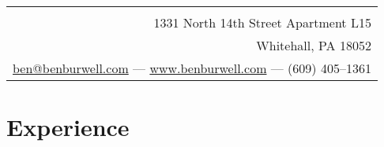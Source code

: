 \documentclass[11pt]{article}
\begin{document}
\thispagestyle{empty}

\noindent\begin{tabularx}{\textwidth}{|N|}
   \\
  1331 North 14th Street Apartment L15 \\
  Whitehall, PA 18052 \\
  \href{mailto:ben@benburwell.com}{ben@benburwell.com} --- \href{https://www.benburwell.com/}{www.benburwell.com} --- (609) 405--1361 \\
  \hline
\end{tabularx}



\section*{Experience}
\end{document}
